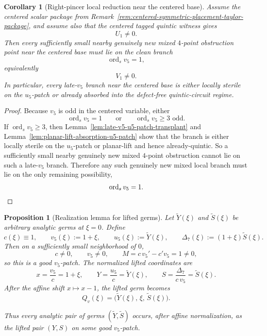 \documentclass[11pt,a4paper]{amsart}
\theoremstyle{plain}
\newtheorem{proposition}[theorem]{Proposition}
\newtheorem{corollary}[theorem]{Corollary}
\theoremstyle{definition}
\begin{document}
\begin{corollary}[Right-pincer local reduction near the centered base]
\label{cor:right-pincer-local-reduction-centered-base}
Assume the centered scalar package from
Remark~\ref{rem:centered-symmetric-placement-taylor-package}, and assume also
that the centered tagged quintic witness gives
\[
U_1\neq 0.
\]
Then every
sufficiently small nearby genuinely new mixed $4$-point obstruction point near
the centered base must lie on the clean branch
\[
\operatorname{ord}_s v_5=1,
\]
equivalently
\[
V_1\neq 0.
\]
In particular, every late-$v_5$ branch near the centered base is either
locally sterile on the $u_5$-patch or already absorbed into the defect-free
quintic-circuit regime.
\end{corollary}

\begin{proof}
Because $v_5$ is odd in the centered variable, either
\[
\operatorname{ord}_s v_5=1
\qquad\text{or}\qquad
\operatorname{ord}_s v_5\ge 3 \text{ odd}.
\]
If $\operatorname{ord}_s v_5\ge 3$, then
Lemma~\ref{lem:late-v5-u5-patch-transplant} and
Lemma~\ref{lem:planar-lift-absorption-u5-patch}
show that the branch is either locally sterile on the $u_5$-patch or
planar-lift and hence already-quintic. So a sufficiently small nearby
genuinely new mixed $4$-point obstruction cannot lie on such a late-$v_5$
branch. Therefore any such genuinely new mixed local branch must lie on the
only remaining possibility,
\[
\operatorname{ord}_s v_5=1.
\qedhere
\]
\end{proof}

\begin{proposition}[Realization lemma for lifted germs]
\label{prop:realization-lemma-lifted-germs}
Let $\widetilde Y(\xi)$ and $\widetilde S(\xi)$ be arbitrary analytic germs
at $\xi=0$. Define
\[
c(\xi)\equiv 1,
\qquad
v_5(\xi):=1+\xi,
\qquad
u_5(\xi):=\widetilde Y(\xi),
\qquad
\Delta_7(\xi):=(1+\xi)\widetilde S(\xi).
\]
Then on a sufficiently small neighborhood of $0$,
\[
c\neq 0,
\qquad
v_5\neq 0,
\qquad
M=c\,v_5'-c'v_5=1\neq 0,
\]
so this is a good $v_5$-patch. The normalized lifted coordinates are
\[
x=\frac{v_5}{c}=1+\xi,
\qquad
Y=\frac{u_5}{c}=\widetilde Y(\xi),
\qquad
S=\frac{\Delta_7}{c\,v_5}=\widetilde S(\xi).
\]
After the affine shift $x\mapsto x-1$, the lifted germ becomes
\[
Q_v(\xi)=\bigl(\widetilde Y(\xi),\,\xi,\,\widetilde S(\xi)\bigr).
\]

Thus every analytic pair of germs $(\widetilde Y,\widetilde S)$ occurs, after
affine normalization, as the lifted pair $(Y,S)$ on some good $v_5$-patch.
\end{proposition}
\end{document}
